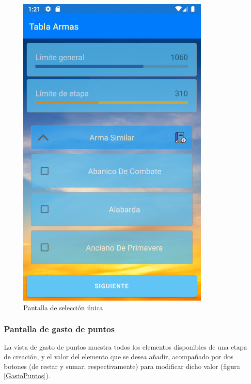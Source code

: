 \begin{figure}[H]
    \centering
    \includegraphics[scale=0.7]{Figures/Capturas/SeleccionMultipleGrupo.png}
    \caption{Pantalla de selección única}
    \label{SeleccionMultipleGrupos}    
\end{figure}

\subsubsection{Pantalla de gasto de puntos}
La vista de gasto de puntos muestra todos los elementos disponibles de una etapa de creación, y el valor del elemento 
que se desea añadir, acompañado por dos botones (de restar y sumar, respectivamente) para modificar dicho valor 
(figura \ref*{GastoPuntos}).

